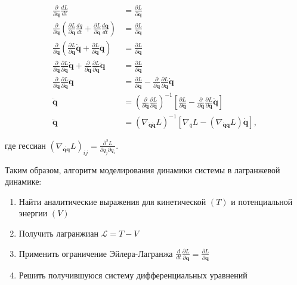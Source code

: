 \documentclass[12pt]{article}
\begin{document}
$$\begin{aligned} 
\frac{\partial}{\partial \dot{\mathbf{q}}} \frac{d L}{d t} 
&=\frac{\partial L}{\partial \mathbf{q}} \\ \frac{\partial}{\partial \dot{\mathbf{q}}}\left(\frac{\partial L}{\partial \mathbf{q}} \frac{d q}{d t}+\frac{\partial L}{\partial \dot{\mathbf{q}}} \frac{d \dot{\mathbf{q}}}{d t}\right) 
&=\frac{\partial L}{\partial \mathbf{q}} \\ \frac{\partial}{\partial \dot{\mathbf{q}}}\left(\frac{\partial L}{\partial \mathbf{q}} \dot{\mathbf{q}}+\frac{\partial L}{\partial \dot{\mathbf{q}}} \ddot{\mathbf{q}}\right) 
&=\frac{\partial L}{\partial \mathbf{q}} \\ \frac{\partial}{\partial \dot{\mathbf{q}}} \frac{\partial L}{\partial \mathbf{q}} \dot{\mathbf{q}}+\frac{\partial}{\partial \dot{\mathbf{q}}} \frac{\partial L}{\partial \dot{\mathbf{q}}} \ddot{\mathbf{q}} 
&=\frac{\partial L}{\partial \mathbf{q}} \\ \frac{\partial}{\partial \dot{\mathbf{q}}} \frac{\partial L}{\partial \dot{\mathbf{q}}} \ddot{\mathbf{q}} 
&=\frac{\partial L}{\partial \mathbf{q}}-\frac{\partial}{\partial \dot{\mathbf{q}}} \frac{\partial L}{\partial \mathbf{q}} \dot{\mathbf{q}} \\ \ddot{\mathbf{q}} 
&=\left(\frac{\partial}{\partial \dot{\mathbf{q}}} \frac{\partial L}{\partial \dot{\mathbf{q}}}\right)^{-1}\left[\frac{\partial L}{\partial \mathbf{q}}-\frac{\partial}{\partial \dot{\mathbf{q}}} \frac{\partial L}{\partial \mathbf{q}} \dot{\mathbf{q}}\right] \\ \ddot{\mathbf{q}} 
&=\left(\nabla_{\dot{\mathbf{q}} \dot{\mathbf{q}}} L\right)^{-1}\left[\nabla_{q} L-\left(\nabla_{\dot{\mathbf{q}}\mathbf{q}} L\right) \dot{\mathbf{q}}\right],
\end{aligned}$$

где гессиан $\left(\nabla_{\dot{\mathbf{q}\mathbf{q}}} L\right)_{i j}=\frac{\partial^{2} L}{\partial q_{j} \partial \dot{q}_{i}}$.

Таким образом, алгоритм моделирования динамики системы в лагранжевой динамике:
\begin{enumerate}
	\item Найти аналитические выражения для кинетической $(T)$ и потенциальной энергии $(V)$
	\item Получить лагранжиан $\mathcal{L} = T - V $
	\item Применить ограничение Эйлера-Лагранжа $\frac{d}{d t} \frac{\partial L}{\partial \mathbf{\dot{q}}} =\frac{\partial L}{\partial \mathbf{q}} $
	\item Решить получившуюся систему дифференциальных уравнений
\end{enumerate}
\end{document}
